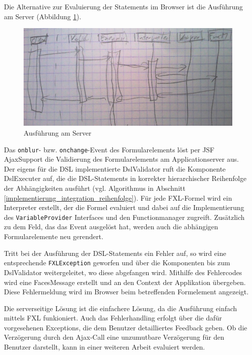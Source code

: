 Die Alternative zur Evaluierung der Statements im Browser ist die Ausführung am Server (Abbildung \ref{abb_uml_seq_server}).

\begin{figure}[ht]
\includegraphics[scale=0.5]{figures/uml_seq_server}
\caption{Ausführung am Server}
\label{abb_uml_seq_server}
\end{figure}

Das \texttt{onblur}- bzw. \texttt{onchange}-Event des Formularelements löst per JSF Ajax\-Support die Validierung des Formularelements am Applicationserver aus. Der eigens für die DSL implementierte DslValidator ruft die Komponente DslExecuter auf, die die DSL-Statements in korrekter hierarchischer Reihenfolge der Abhängigkeiten ausführt (vgl. Algorithmus in Abschnitt \ref{implementierung_integration_reihenfolge}). Für jede FXL-Formel wird ein Interpreter erstellt, der die Formel evaluiert und dabei auf die Implementierung des \texttt{VariableProvider} Interfaces und den Functionmanager zugreift. Zu\-sätz\-lich zu dem Feld, das das Event ausgelöst hat, werden auch die abhängigen Formularelemente neu gerendert.

Tritt bei der Ausführung der DSL-Statements ein Fehler auf, so wird eine entsprechende \texttt{FXLException} geworfen und über die Komponenten bis zum DslValidator weitergeleitet, wo diese abgefangen wird. Mithilfe des Fehlercodes wird eine FacesMessage erstellt und an den Context der Applikation übergeben. Diese Fehlermeldung wird im Browser beim betreffenden Formelement angezeigt.

Die serverseitige Lösung ist die einfachere Lösung, da die Ausführung einfach mittels FXL funkioniert. Auch das Fehlerhandling erfolgt über die dafür vorgesehenen Exceptions, die dem Benutzer detailliertes Feedback geben. Ob die Verzögerung durch den Ajax-Call eine unzumutbare Verzögerung für den Benutzer darstellt, kann in einer weiteren Arbeit evaluiert werden. 


